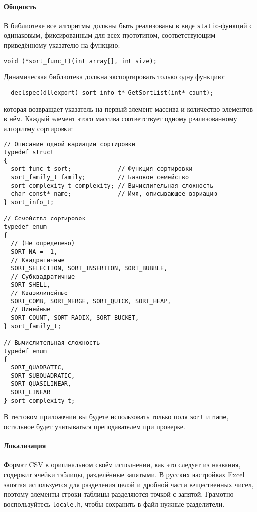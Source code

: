 \paragraph{Общность}
В библиотеке все алгоритмы должны быть реализованы в виде \texttt{static}-функций с одинаковым,
фиксированным для всех прототипом, соответствующим приведённому указателю на функцию:
%
\begin{verbatim}
void (*sort_func_t)(int array[], int size);
\end{verbatim}

Динамическая библиотека должна экспортировать только одну функцию:
%
\begin{verbatim}
__declspec(dllexport) sort_info_t* GetSortList(int* count);
\end{verbatim}
%
которая возвращает указатель на первый элемент массива и количество элементов в нём.
Каждый элемент этого массива соответствует одному реализованному алгоритму сортировки:

\begin{verbatim}
// Описание одной вариации сортировки
typedef struct
{
  sort_func_t sort;             // Функция сортировки
  sort_family_t family;         // Базовое семейство
  sort_complexity_t complexity; // Вычислительная сложность
  char const* name;             // Имя, описывающее вариацию
} sort_info_t;

// Семейства сортировок
typedef enum
{
  // (Не определено)
  SORT_NA = -1,
  // Квадратичные
  SORT_SELECTION, SORT_INSERTION, SORT_BUBBLE,
  // Субквадратичные
  SORT_SHELL,
  // Квазилинейные
  SORT_COMB, SORT_MERGE, SORT_QUICK, SORT_HEAP,
  // Линейные
  SORT_COUNT, SORT_RADIX, SORT_BUCKET,
} sort_family_t;

// Вычислительная сложность
typedef enum
{
  SORT_QUADRATIC,
  SORT_SUBQUADRATIC,
  SORT_QUASILINEAR,
  SORT_LINEAR
} sort_complexity_t;
\end{verbatim}

В тестовом приложении вы будете использовать только поля \texttt{sort} и \texttt{name}, остальное
будет учитываться преподавателем при проверке.

\paragraph{Локализация}
Формат CSV в оригинальном своём исполнении, как это следует из названия, содержит ячейки таблицы,
разделённые запятыми. В русских настройках Excel запятая используется для разделения целой и дробной
части вещественных чисел, поэтому элементы строки таблицы разделяются точкой с запятой. Грамотно
воспользуйтесь \texttt{locale.h}, чтобы сохранить в файл нужные разделители.

